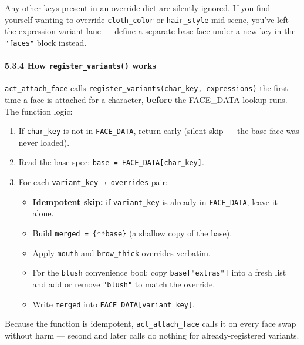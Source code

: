 \documentclass[
  11pt,
]{book}
\providecommand{\tightlist}{%
  \setlength{\itemsep}{0pt}\setlength{\parskip}{0pt}}
\begin{document}
Any other keys present in an override dict are silently ignored. If you
find yourself wanting to override \texttt{cloth\_color} or
\texttt{hair\_style} mid-scene, you've left the expression-variant lane
--- define a separate base face under a new key in the \texttt{"faces"}
block instead.

\paragraph{\texorpdfstring{5.3.4 How \texttt{register\_variants()}
works}{5.3.4 How register\_variants() works}}\label{how-register_variants-works}

\texttt{act\_attach\_face} calls
\texttt{register\_variants(char\_key,\ expressions)} the first time a
face is attached for a character, \textbf{before} the FACE\_DATA lookup
runs. The function logic:

\begin{enumerate}
\def\labelenumi{\arabic{enumi}.}
\tightlist
\item
  If \texttt{char\_key} is not in \texttt{FACE\_DATA}, return early
  (silent skip --- the base face was never loaded).
\item
  Read the base spec: \texttt{base\ =\ FACE\_DATA{[}char\_key{]}}.
\item
  For each \texttt{variant\_key\ →\ overrides} pair:

  \begin{itemize}
  \tightlist
  \item
    \textbf{Idempotent skip:} if \texttt{variant\_key} is already in
    \texttt{FACE\_DATA}, leave it alone.
  \item
    Build \texttt{merged\ =\ \{**base\}} (a shallow copy of the base).
  \item
    Apply \texttt{mouth} and \texttt{brow\_thick} overrides verbatim.
  \item
    For the \texttt{blush} convenience bool: copy
    \texttt{base{[}"extras"{]}} into a fresh list and add or remove
    \texttt{"blush"} to match the override.
  \item
    Write \texttt{merged} into \texttt{FACE\_DATA{[}variant\_key{]}}.
  \end{itemize}
\end{enumerate}

Because the function is idempotent, \texttt{act\_attach\_face} calls it
on every face swap without harm --- second and later calls do nothing
for already-registered variants.
\end{document}
